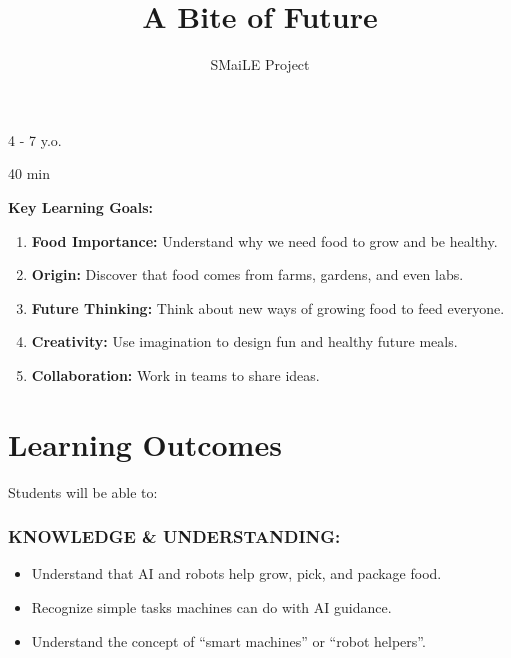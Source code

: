 \documentclass[11pt, a4paper]{article}
\begin{document}
\title{\textbf{\color{SmaileGreen}A Bite of Future}}
\author{SMaiLE Project}
\date{}
\maketitle
\thispagestyle{plain}

\begin{keyinfobox}
    \begin{description}[leftmargin=*, labelindent=0pt]
        \item[\bfseries\color{SmaileGreen} Target Group:] 4 - 7 y.o.
        \item[\bfseries\color{SmaileGreen} Duration:] 40 min
    \end{description}
    \textbf{Key Learning Goals:}
    \begin{enumerate}
        \item \textbf{Food Importance:} Understand why we need food to grow and be healthy.
        \item \textbf{Origin:} Discover that food comes from farms, gardens, and even labs.
        \item \textbf{Future Thinking:} Think about new ways of growing food to feed everyone.
        \item \textbf{Creativity:} Use imagination to design fun and healthy future meals.
        \item \textbf{Collaboration:} Work in teams to share ideas.
    \end{enumerate}
\end{keyinfobox}

\section*{Learning Outcomes}
Students will be able to:

\subsubsection*{KNOWLEDGE \& UNDERSTANDING:}
\begin{itemize}
    \item Understand that AI and robots help grow, pick, and package food.
    \item Recognize simple tasks machines can do with AI guidance.
    \item Understand the concept of ``smart machines'' or ``robot helpers''.
\end{itemize}
\end{document}
